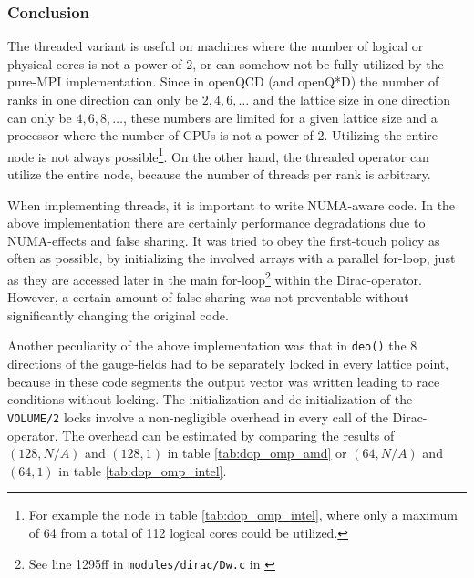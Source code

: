 \documentclass{article}
\theoremstyle{plain} %
\theoremstyle{convention} %
\theoremstyle{remark} %
\def\code#1{\texttt{#1}}
\numberwithin{equation}{section}
\begin{document}
\subsubsection{Conclusion}

The threaded variant is useful on machines where the number of logical or physical cores is not a power of \num{2}, or can somehow not be fully utilized by the pure-MPI implementation. Since in openQCD (and openQ*D) the number of ranks in one direction can only be $2,4,6,\dots$ and the lattice size in one direction can only be $4,6,8,\dots$, these numbers are limited for a given lattice size and a processor where the number of CPUs is not a power of \num{2}. Utilizing the entire node is not always possible\footnote{For example the node in table \ref{tab:dop_omp_intel}, where only a maximum of \num{64} from a total of \num{112} logical cores could be utilized.}. On the other hand, the threaded operator can utilize the entire node, because the number of threads per rank is arbitrary.

When implementing threads, it is important to write NUMA-aware code. In the above implementation there are certainly performance degradations due to NUMA-effects and false sharing. It was tried to obey the first-touch policy as often as possible, by initializing the involved arrays with a parallel for-loop, just as they are accessed later in the main for-loop\footnote{See line 1295ff in \code{modules/dirac/Dw.c} in \cite{openqcd_threads}} within the Dirac-operator. However, a certain amount of false sharing was not preventable without significantly changing the original code.

Another peculiarity of the above implementation was that in \code{deo()} the \num{8} directions of the gauge-fields had to be separately locked in every lattice point, because in these code segments the output vector was written leading to race conditions without locking. The initialization and de-initialization of the \code{VOLUME/2} locks involve a non-negligible overhead in every call of the Dirac-operator. The overhead can be estimated by comparing the results of $(128, N/A)$ and $(128, 1)$ in table \ref{tab:dop_omp_amd} or $(64, N/A)$ and $(64, 1)$ in table \ref{tab:dop_omp_intel}.
\end{document}
